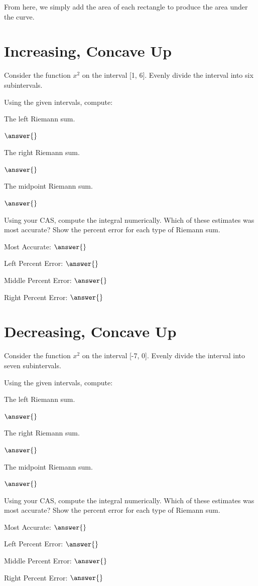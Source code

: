 \documentclass{ximera}
\begin{document}
From here, we simply add the area of each rectangle to produce the area under the curve.

\section{Increasing, Concave Up}
Consider the function $x^2$ on the interval [1, 6]. Evenly divide the interval into six subintervals.
\begin{question}
Using the given intervals, compute:

The left Riemann sum.

$\answer{}$

The right Riemann sum.

$\answer{}$

The midpoint Riemann sum.

$\answer{}$

Using your CAS, compute the integral numerically. Which of these estimates was most accurate? Show the percent error for each type of Riemann sum.

Most Accurate: $\answer{}$

Left Percent Error: $\answer{}$

Middle Percent Error: $\answer{}$

Right Percent Error: $\answer{}$
\end{question}

\section{Decreasing, Concave Up}
\begin{question}
Consider the function $x^2$ on the interval [-7, 0]. Evenly divide the interval into seven subintervals.

Using the given intervals, compute:

The left Riemann sum.

$\answer{}$

The right Riemann sum.

$\answer{}$

The midpoint Riemann sum.

$\answer{}$

Using your CAS, compute the integral numerically. Which of these estimates was most accurate? Show the percent error for each type of Riemann sum.

Most Accurate: $\answer{}$

Left Percent Error: $\answer{}$

Middle Percent Error: $\answer{}$

Right Percent Error: $\answer{}$
\end{question}
\end{document}
